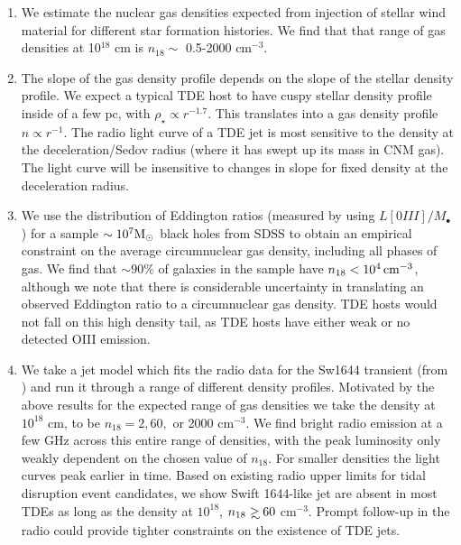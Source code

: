 \documentclass[usenatbib,fleqn]{mnras}
\newcommand\gsim{\mathrel{\rlap{\lower4pt\hbox{\hskip1pt$\sim$}}
    \raise1pt\hbox{$>$}}}
\newcommand{\Mbh}[1][]{M_{\bullet#1}}
\newcommand{\Msun}{{\rm M_\odot}}
\begin{document}
\begin{enumerate}
\item We estimate the nuclear gas densities expected from injection of
  stellar wind material for different star formation histories. We
  find that that range of gas densities at 10$^{18}$ cm is $n_{18}
  \sim$ 0.5-2000 cm$^{-3}$.

\item The slope of the gas density profile depends on the slope of the
  stellar density profile. We expect a typical TDE host to have cuspy
  stellar density profile inside of a few pc, with $\rho_\star
  \propto r^{-1.7}$. This translates into a gas density profile $n
  \propto r^{-1}$. The radio light curve of a TDE jet is most
  sensitive to the density at the deceleration/Sedov radius (where it
  has swept up its mass in CNM gas). The light curve will be
  insensitive to changes in slope for fixed density at the
  deceleration radius.

\item We use the distribution of Eddington ratios (measured by
  \citealt{Kauffmann&Heckman2009} using $L[0III]/\Mbh$) for a sample
  $\sim 10^{7} \Msun$ black holes from SDSS to obtain an empirical
  constraint on the average circumnuclear gas density, including all
  phases of gas. We find that $\sim90\%$ of galaxies in the sample
  have $n_{18}<10^{4} \, {\rm cm}^{-3}$, although we note that there is
  considerable uncertainty in translating an observed Eddington ratio
  to a circumnuclear gas density. TDE hosts would not fall on this
  high density tail, as TDE hosts have either weak or no detected OIII
  emission.

\item We take a jet model which fits the radio data for the Sw1644
  transient (from \citealt{Mimica+2015}) and run it through a range of
  different density profiles. Motivated by the above results for the
  expected range of gas densities we take the density at $10^{18}$ cm,
  to be $n_{18}=2, 60,$ or 2000 cm$^{-3}$. We find bright radio
  emission at a few GHz across this entire range of densities, with
  the peak luminosity only weakly dependent on the chosen value of
  $n_{18}$.  For smaller densities the light curves peak earlier in
  time. Based on existing radio upper limits for tidal disruption
  event candidates, we show Swift 1644-like jet are absent in most TDEs
  as long as the density at $10^{18}$, $n_{18} \gsim  60$
  cm$^{-3}$. Prompt follow-up in the radio could provide tighter
  constraints on the existence of TDE jets.  
\end{enumerate}
\end{document}
